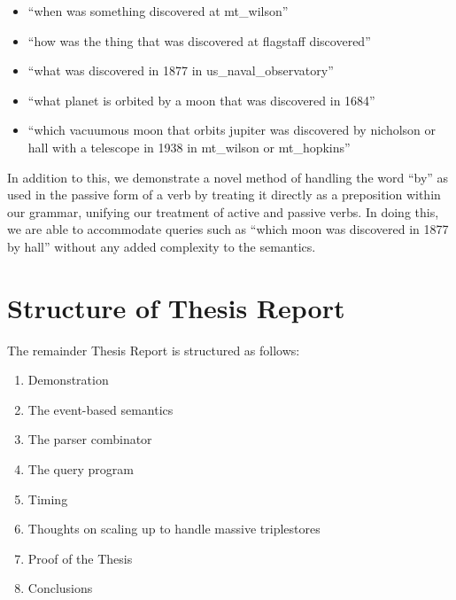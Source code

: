 \documentclass[../main.tex]{subfiles}
\begin{document}
\begin{itemize}
	\item ``when was something discovered at mt\_wilson''
	\item ``how was the thing that was discovered at flagstaff discovered''
	\item ``what was discovered in 1877 in us\_naval\_observatory''
	\item ``what planet is orbited by a moon that was discovered in 1684''
	\item ``which vacuumous moon that orbits jupiter was discovered by nicholson or hall with a telescope in 1938 in mt\_wilson or mt\_hopkins''
\end{itemize}

In addition to this, we demonstrate a novel method of handling the word ``by'' as used in the passive form of a verb by treating it directly as a preposition within our grammar, unifying our treatment of active and passive verbs.  In doing this, we are able to accommodate queries such as ``which moon was discovered in 1877 by hall'' without any added complexity to the semantics.

\section{Structure of Thesis Report}

The remainder Thesis Report is structured as follows:

\begin{enumerate}
	\item Demonstration
	\item The event-based semantics
	\item The parser combinator
	\item The query program
	\item Timing
	\item Thoughts on scaling up to handle massive triplestores
	\item Proof of the Thesis
	\item Conclusions
\end{enumerate}
\end{document}
